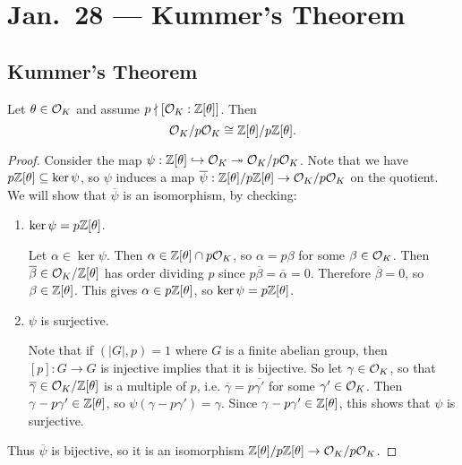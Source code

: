 \chapter{Jan.~28 --- Kummer's Theorem}

\section{Kummer's Theorem}

\begin{lemma}
  Let $\theta \in \mathcal{O}_K$ and assume
  $p \nmid [\mathcal{O}_K : \mathbb{Z}[\theta]]$. Then
  \[
    \mathcal{O}_K / p \mathcal{O}_K \cong \mathbb{Z}[\theta] / p \mathbb{Z}[\theta].
  \]
\end{lemma}

\begin{proof}
  Consider the map $\psi: \mathbb{Z}[\theta] \hookrightarrow \mathcal{O}_K \twoheadrightarrow \mathcal{O}_K / p \mathcal{O}_K$.
  Note that we have $p\mathbb{Z}[\theta] \subseteq \ker \psi$,
  so $\psi$ induces a map $\overline{\psi}: \mathbb{Z}[\theta] / p \mathbb{Z}[\theta] \to \mathcal{O}_K / p \mathcal{O}_K$
  on the quotient. We will show that
  $\overline{\psi}$ is an isomorphism, by checking:
  \begin{enumerate}
    \item $\ker \psi = p \mathbb{Z}[\theta]$.

  Let $\alpha \in \ker \psi$.
  Then $\alpha \in \mathbb{Z}[\theta] \cap p \mathcal{O}_K$, so
  $\alpha = p \beta$ for some $\beta \in \mathcal{O}_K$.
  Then $\overline{\beta} \in \mathcal{O}_K / \mathbb{Z}[\theta]$
  has order dividing $p$ since $p \overline{\beta} = \overline{\alpha} = 0$.
  Therefore $\overline{\beta} = 0$, so
  $\beta \in \mathbb{Z}[\theta]$. This gives $\alpha \in p\mathbb{Z}[\theta]$, so
  $\ker \psi = p \mathbb{Z}[\theta]$.

  \item $\psi$ is surjective.

  Note that if $(|G|, p) = 1$ where $G$ is a
  finite abelian group, then $[p] : G \to G$ is injective
  implies that it is bijective. So let $\gamma \in \mathcal{O}_K$,
  so that $\overline{\gamma} \in \mathcal{O}_K / \mathbb{Z}[\theta]$ is
  a multiple of $p$, i.e. $\overline{\gamma} = p \overline{\gamma'}$ for some $\gamma' \in \mathcal{O}_K$.
  Then $\gamma - p \gamma' \in \mathbb{Z}[\theta]$,
  so $\psi(\gamma - p\gamma') = \gamma$.
  Since $\gamma - p \gamma' \in \mathbb{Z}[\theta]$, this
  shows that $\psi$ is surjective.
  \end{enumerate}

  Thus $\overline{\psi}$ is bijective, so it
  is an isomorphism $\mathbb{Z}[\theta] / p \mathbb{Z}[\theta] \to \mathcal{O}_K / p \mathcal{O}_K$.
\end{proof}


